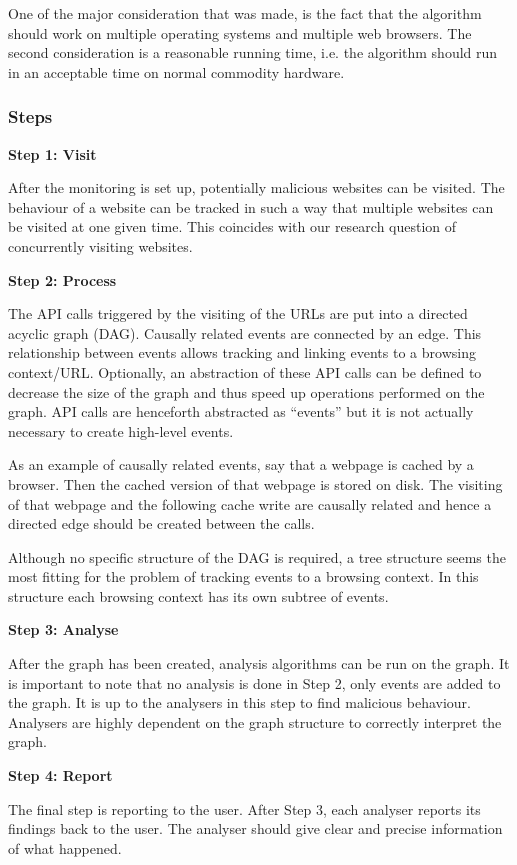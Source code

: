 One of the major consideration that was made, is the fact that the algorithm should work on multiple operating systems and multiple web browsers. The second consideration is a reasonable running time, i.e. the algorithm should run in an acceptable time on normal commodity hardware.

\subsubsection{Steps}

\textbf{Step 1: Visit}

After the monitoring is set up, potentially malicious websites can be visited. The behaviour of a website can be tracked in such a way that multiple websites can be visited at one given time. This coincides with our research question of concurrently visiting websites.

\textbf{Step 2: Process}
\label{sec:algos2}

The API calls triggered by the visiting of the URLs are put into a directed acyclic graph (DAG). Causally related events are connected by an edge. This relationship between events allows tracking and linking events to a browsing context/URL. Optionally, an abstraction of these API calls can be defined to decrease the size of the graph and thus speed up operations performed on the graph. API calls are henceforth abstracted as ``events'' but it is not actually necessary to create high-level events.

As an example of causally related events, say that a webpage is cached by a browser. Then the cached version of that webpage is stored on disk. The visiting of that webpage and the following cache write are causally related and hence a directed edge should be created between the calls.

Although no specific structure of the DAG is required, a tree structure seems the most fitting for the problem of tracking events to a browsing context. In this structure each browsing context has its own subtree of events.

\textbf{Step 3: Analyse}

After the graph has been created, analysis algorithms can be run on the graph. It is important to note that no analysis is done in Step 2, only events are added to the graph. It is up to the analysers in this step to find malicious behaviour. Analysers are highly dependent on the graph structure to correctly interpret the graph.

\pagebreak

\textbf{Step 4: Report}

The final step is reporting to the user. After Step 3, each analyser reports its findings back to the user. The analyser should give clear and precise information of what happened.
